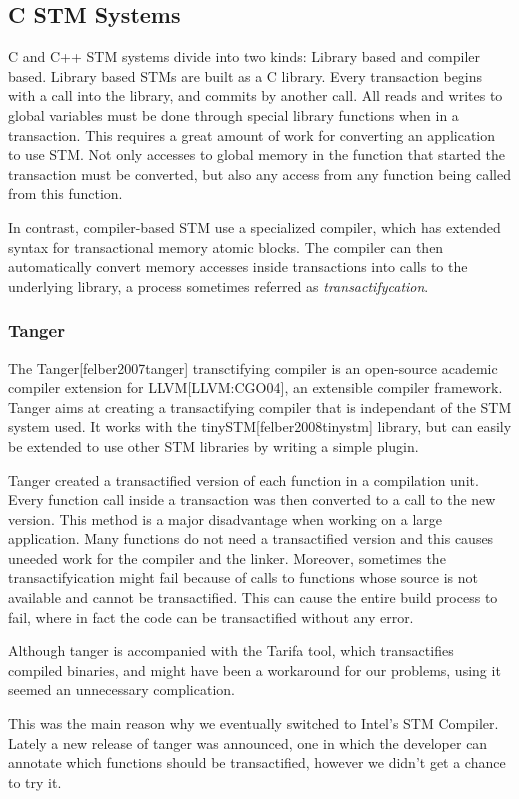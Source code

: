 \documentclass[preprint,natbib,11pt]{sigplanconf}
\begin{document}
\subsection{C STM Systems}
C and C++ STM systems divide into two kinds: Library based and compiler based. Library based STMs are built as a C library. Every transaction begins with a call into the library, and commits by another call. All reads and writes to global variables must be done through special library functions when in a transaction. This requires a great amount of work for converting an application to use STM. Not only accesses to global memory in the function that started the transaction must be converted, but also any access from any function being called from this function. 

In contrast, compiler-based STM use a specialized compiler, which has extended syntax for transactional memory atomic blocks. The compiler can then automatically convert memory accesses inside transactions into calls to the underlying library, a process sometimes referred as \emph{transactifycation}. 
\subsubsection{Tanger}
The Tanger[felber2007tanger] transctifying compiler is an open-source academic compiler extension for LLVM[LLVM:CGO04], an extensible compiler framework. Tanger aims at creating a transactifying compiler that is independant of the STM system used. It works with the tinySTM[felber2008tinystm] library, but can easily be extended to use other STM libraries by writing a simple plugin.

Tanger created a transactified version of each function in a compilation unit. Every function call inside a transaction was then converted to a call to the new version. This method is a major disadvantage when working on a large application. Many functions do not need a transactified version and this causes uneeded work for the compiler and the linker. Moreover, sometimes the transactifyication might fail because of calls to functions whose source is not available and cannot be transactified. This can cause the entire build process to fail, where in fact the code can be transactified without any error.

Although tanger is accompanied with the Tarifa tool, which transactifies compiled binaries, and might have been a workaround for our problems, using it seemed an unnecessary complication.

This was the main reason why we eventually switched to Intel's STM Compiler. Lately a new release of tanger was announced, one in which the developer can annotate which functions should be transactified, however we didn't get a chance to try it.
\end{document}
